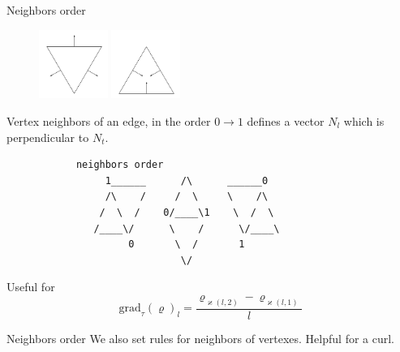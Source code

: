 \documentclass{beamer}
\begin{document}
\begin{frame}[fragile]{Neighbors order}
  \begin{figure}[htbp]
  \centering
  \includegraphics[width=0.2\textwidth]{flow_downward.pdf}
  \includegraphics[width=0.2\textwidth]{flow_upward.pdf}
  \end{figure}

  Vertex neighbors of an edge, in the order $0 \rightarrow 1$ defines a vector $N_l$ which is perpendicular to $N_t$.
  \begin{lstlisting}
            neighbors order
                 1______      /\      ______0
                 /\    /     /  \     \    /\
                /  \  /    0/____\1    \  /  \
               /____\/      \    /      \/____\
                     0       \  /       1
                              \/
  \end{lstlisting}

  Useful for
  \[\text{grad}_{\tau}(\varrho)_l = \frac{\varrho_{\varkappa(l,2)}-\varrho_{\varkappa(l,1)}}{l}\]
\end{frame}

\begin{frame}{Neighbors order}
  We also set rules for neighbors of vertexes. Helpful for a curl.
\end{frame}
\end{document}
